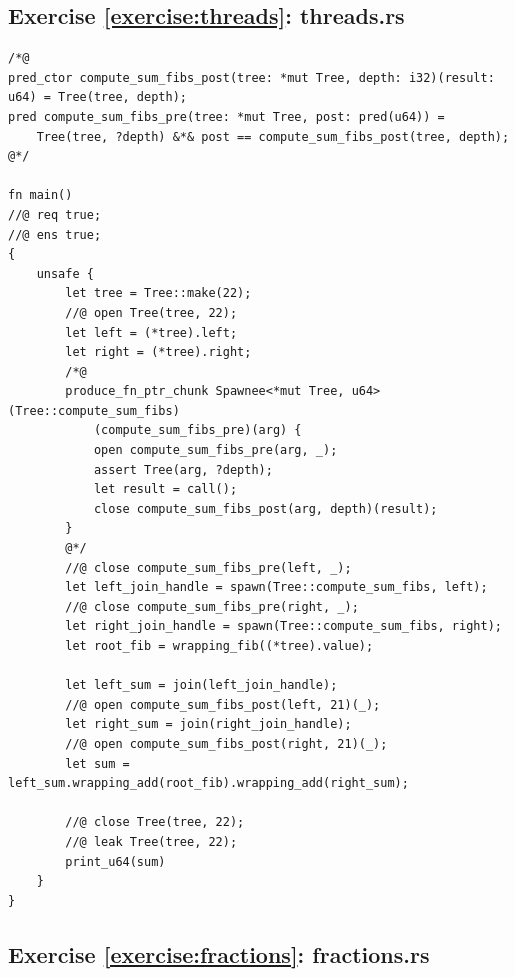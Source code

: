 \documentclass{article}
\begin{document}
\subsection{Exercise \ref{exercise:threads}:
threads.rs}\label{solution:threads}

\begin{lstlisting}
/*@
pred_ctor compute_sum_fibs_post(tree: *mut Tree, depth: i32)(result: u64) = Tree(tree, depth);
pred compute_sum_fibs_pre(tree: *mut Tree, post: pred(u64)) =
    Tree(tree, ?depth) &*& post == compute_sum_fibs_post(tree, depth);
@*/

fn main()
//@ req true;
//@ ens true;
{
    unsafe {
        let tree = Tree::make(22);
        //@ open Tree(tree, 22);
        let left = (*tree).left;
        let right = (*tree).right;
        /*@
        produce_fn_ptr_chunk Spawnee<*mut Tree, u64>(Tree::compute_sum_fibs)
            (compute_sum_fibs_pre)(arg) {
            open compute_sum_fibs_pre(arg, _);
            assert Tree(arg, ?depth);
            let result = call();
            close compute_sum_fibs_post(arg, depth)(result);
        }
        @*/
        //@ close compute_sum_fibs_pre(left, _);
        let left_join_handle = spawn(Tree::compute_sum_fibs, left);
        //@ close compute_sum_fibs_pre(right, _);
        let right_join_handle = spawn(Tree::compute_sum_fibs, right);
        let root_fib = wrapping_fib((*tree).value);

        let left_sum = join(left_join_handle);
        //@ open compute_sum_fibs_post(left, 21)(_);
        let right_sum = join(right_join_handle);
        //@ open compute_sum_fibs_post(right, 21)(_);
        let sum = left_sum.wrapping_add(root_fib).wrapping_add(right_sum);
        
        //@ close Tree(tree, 22);
        //@ leak Tree(tree, 22);
        print_u64(sum)
    }
}
\end{lstlisting}

\subsection{Exercise \ref{exercise:fractions}:
fractions.rs}\label{solution:fractions}
\end{document}
